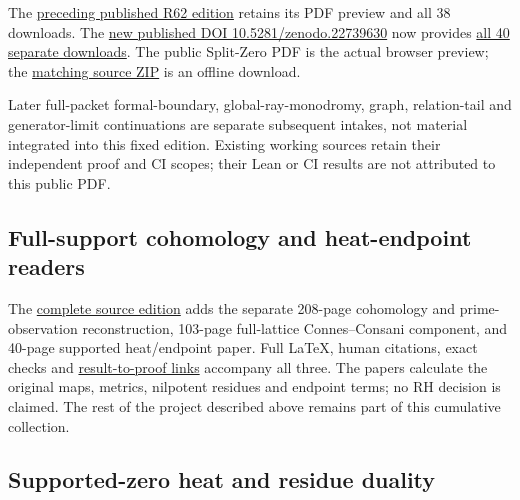 \documentclass[
]{article}
\begin{document}
The \href{https://doi.org/10.5281/zenodo.22738226}{preceding published
R62 edition} retains its PDF preview and all 38 downloads. The
\href{https://doi.org/10.5281/zenodo.22739630}{new published DOI
10.5281/zenodo.22739630} now provides
\href{calculation_edition_20260914_recursive_source_relations/README.md}{all
40 separate downloads}. The public Split-Zero PDF is the actual browser
preview; the
\href{https://zenodo.org/api/records/22739630/files/40-splitzero-recursive-public-sources.zip/content}{matching
source ZIP} is an offline download.

Later full-packet formal-boundary, global-ray-monodromy, graph,
relation-tail and generator-limit continuations are separate subsequent
intakes, not material integrated into this fixed edition. Existing
working sources retain their independent proof and CI scopes; their Lean
or CI results are not attributed to this public PDF.

\subsection{Full-support cohomology and heat-endpoint
readers}\label{full-support-cohomology-and-heat-endpoint-readers}

The
\href{https://github.com/KokunoYumeto/zeta-function-research-reader/tree/main/workbenches/splitzero-tandem/continuations/20260923-cohomology-heat-residue}{complete
source edition} adds the separate 208-page cohomology and
prime-observation reconstruction, 103-page full-lattice Connes--Consani
component, and 40-page supported heat/endpoint paper. Full LaTeX, human
citations, exact checks and
\href{https://github.com/KokunoYumeto/zeta-function-research-reader/blob/main/workbenches/splitzero-tandem/continuations/20260923-cohomology-heat-residue/RESULTS_AND_PROOF_LINKS.json}{result-to-proof
links} accompany all three. The papers calculate the original maps,
metrics, nilpotent residues and endpoint terms; no RH decision is
claimed. The rest of the project described above remains part of this
cumulative collection.

\subsection{Supported-zero heat and residue
duality}\label{supported-zero-heat-and-residue-duality}
\end{document}
